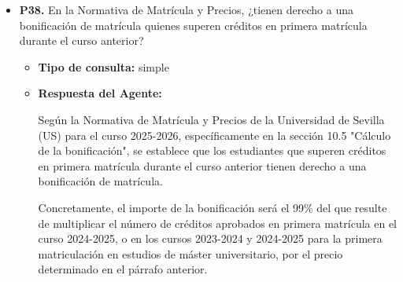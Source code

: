 \documentclass{article}
\begin{document}
\begin{itemize}
\begin{itemize}
                        Es importante destacar que los requisitos pueden variar dependiendo de la plaza y la convocatoria específica. Por lo tanto, es recomendable consultar la convocatoria y la normativa específica para cada plaza para obtener información precisa y actualizada.

                        En cuanto a la edad, no se establece un límite máximo en la normativa proporcionada, pero es importante tener en cuenta que la Ley Orgánica 2/2023, de 22 de marzo, del Sistema Universitario, establece que la edad de jubilación para el personal docente e investigador es de 65 años. Sin embargo, esta edad puede variar dependiendo de la legislación y la normativa específica de cada universidad.

                        En resumen, los requisitos esenciales para un solicitante español son la posesión de una titulación universitaria adecuada, experiencia docente y otros requisitos específicos que pueden variar dependiendo de la plaza y la convocatoria. Es importante consultar la normativa específica para cada plaza para obtener información precisa y actualizada.
                  \item \textbf{Contexto utilizado:}

            \end{itemize}

      \item \textbf{P38.} En la Normativa de Matrícula y Precios, ¿tienen derecho a una bonificación de matrícula quienes superen créditos en primera matrícula durante el curso anterior? \\
            \begin{itemize}
                  \item \textbf{Tipo de consulta:} simple
                  \item \textbf{Respuesta del Agente:}

                        Según la Normativa de Matrícula y Precios de la Universidad de Sevilla (US) para el curso 2025-2026, específicamente en la sección 10.5 "Cálculo de la bonificación", se establece que los estudiantes que superen créditos en primera matrícula durante el curso anterior tienen derecho a una bonificación de matrícula.

                        Concretamente, el importe de la bonificación será el 99\% del que resulte de multiplicar el número de créditos aprobados en primera matrícula en el curso 2024-2025, o en los cursos 2023-2024 y 2024-2025 para la primera matriculación en estudios de máster universitario, por el precio determinado en el párrafo anterior.


\end{itemize}
\end{itemize}
\end{document}
